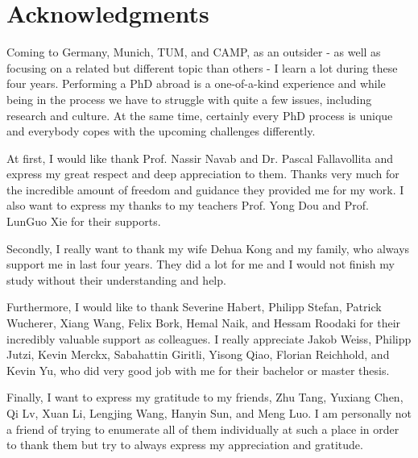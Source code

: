 %
\chapter*{Acknowledgments}
\label{sec:acknowledgement}

Coming to Germany, Munich, TUM, and CAMP, as an outsider - as well as focusing on a related but different topic than others - I learn a lot during these four years.
Performing a PhD abroad is a one-of-a-kind experience and while being in the process we have to struggle with quite a few issues, including research and culture.
At the same time, certainly every PhD process is unique and everybody copes with the upcoming challenges differently.

At first, I would like thank Prof. Nassir Navab and Dr. Pascal Fallavollita and express my great respect and deep appreciation to them. Thanks very much for the incredible amount of freedom and guidance they provided me for my work. I also want to express my thanks to my teachers Prof. Yong Dou and Prof. LunGuo Xie for their supports. 

Secondly, I really want to thank my wife Dehua Kong and my family, who always support me in last four years. They did a lot for me and I would not finish my study without their understanding and help.

Furthermore, I would like to thank Severine Habert, Philipp Stefan, Patrick Wucherer, Xiang Wang, Felix Bork, Hemal Naik, and Hessam Roodaki for their incredibly valuable support as colleagues. I really appreciate Jakob Weiss, Philipp Jutzi, Kevin Merckx, Sabahattin Giritli, Yisong Qiao, Florian Reichhold, and Kevin Yu, who did very good job with me for their bachelor or master thesis.

Finally, I want to express my gratitude to my friends, Zhu Tang, Yuxiang Chen, Qi Lv, Xuan Li, Lengjing Wang, Hanyin Sun, and Meng Luo.
I am personally not a friend of trying to enumerate all of them individually at such a place in order to thank them but try to always express my appreciation and gratitude.


